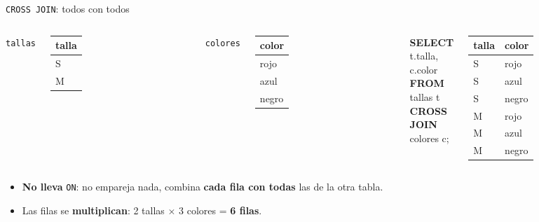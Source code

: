 \documentclass[aspectratio=169,10pt,c]{beamer}
\newcommand{\tbl}[1]{\textcolor{utpNaranja}{\texttt{#1}}}
\newcommand{\kw}[1]{\textcolor{utpRojo}{\textbf{#1}}}
\newcommand{\nuevo}[1]{{%
  \setlength{\fboxsep}{1.2pt}%
  \begingroup
  \renewcommand{\kw}[1]{\textcolor{utpNegro}{\textbf{##1}}}%
  \colorbox{yellow!45}{\textcolor{utpNegro}{#1}}%
  \endgroup}}
\newenvironment{sqlcode}[1][.86\textwidth]
  {\begin{center}\begin{lrbox}{\sqlbuf}\begin{minipage}{#1}\ttfamily\footnotesize\vspace{6pt}\raggedright}
  {\vspace{6pt}\end{minipage}\end{lrbox}\colorbox{utpGrisClaro}{\usebox{\sqlbuf}}\end{center}}
\begin{document}
\begin{frame}{\texttt{CROSS JOIN}: todos con todos}
\begin{columns}[c,onlytextwidth]
\centering\tbl{tallas}\\[4pt]
\scriptsize\ttfamily
\begin{tabular}{l}
\toprule
\normalfont\bfseries talla \\
\midrule
S \\ M \\
\bottomrule
\end{tabular}
\centering\tbl{colores}\\[4pt]
\scriptsize\ttfamily
\begin{tabular}{l}
\toprule
\normalfont\bfseries color \\
\midrule
rojo \\ azul \\ negro \\
\bottomrule
\end{tabular}
\begin{sqlcode}[\textwidth]
\scriptsize
\kw{SELECT} t.talla, c.color\\
\kw{FROM} tallas t\\
\nuevo{\kw{CROSS JOIN}} colores c;
\end{sqlcode}
\centering\scriptsize\ttfamily
\begin{tabular}{ll}
\toprule
\normalfont\bfseries talla & \normalfont\bfseries color \\
\midrule
S & rojo \\ S & azul \\ S & negro \\
M & rojo \\ M & azul \\ M & negro \\
\bottomrule
\end{tabular}
\end{columns}
\vspace{0.3cm}
\begin{itemize}\setlength\itemsep{6pt}
  \item \textbf{No lleva} \texttt{ON}: no empareja nada, combina \textbf{cada fila con todas} las de la otra tabla.
  \item Las filas se \textbf{multiplican}: 2 tallas $\times$ 3 colores = \textbf{6 filas}.
\end{itemize}
\vspace{0.2cm}
\end{frame}
\end{document}
